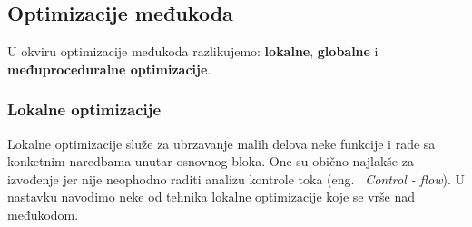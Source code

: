 \documentclass[a4paper]{article}
\begin{document}
\subsection{Optimizacije međukoda}
\label{subsec:optimizacija_međukod}
U okviru optimizacije međukoda razlikujemo: \textbf{lokalne}, \textbf{globalne} i \textbf{međuproceduralne optimizacije}.

\subsubsection{Lokalne optimizacije}
\label{subsubsec:lokalne}
Lokalne optimizacije služe za ubrzavanje malih delova neke funkcije i rade sa konketnim naredbama unutar osnovnog bloka.
One su obično najlakše za izvođenje jer nije neophodno raditi analizu kontrole toka (eng. ~{\em  Control - flow}).  
U nastavku navodimo neke od tehnika lokalne optimizacije koje se vrše nad međukodom. 
\end{document}
